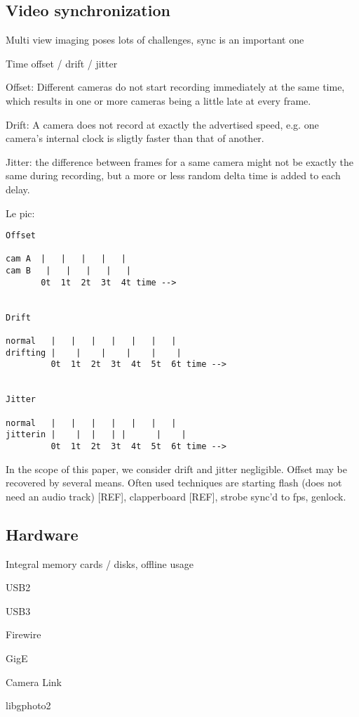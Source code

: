 \subsection{Video synchronization}

Multi view imaging poses lots of challenges, sync is an important one

Time offset / drift / jitter

Offset: Different cameras do not start recording immediately at the same time, which results in one or more cameras being a little late at every frame.

Drift: A camera does not record at exactly the advertised speed, e.g. one camera's internal clock is sligtly faster than that of another.

Jitter: the difference between frames for a same camera might not be exactly the same during recording, but a more or less random delta time is added to each delay.

Le pic:

\begin{verbatim}
Offset

cam A  |   |   |   |   |
cam B   |   |   |   |   |
       0t  1t  2t  3t  4t time -->


Drift

normal   |   |   |   |   |   |   |
drifting |    |    |    |    |    |
         0t  1t  2t  3t  4t  5t  6t time -->


Jitter

normal   |   |   |   |   |   |   |
jitterin |    |  |   | |      |    |
         0t  1t  2t  3t  4t  5t  6t time -->
\end{verbatim}

In the scope of this paper, we consider drift and jitter negligible.
Offset may be recovered by several means.
Often used techniques are starting flash (does not need an audio track) [REF], clapperboard [REF], strobe sync'd to fps, genlock.


\subsection{Hardware}

Integral memory cards / disks, offline usage

USB2

USB3

Firewire

GigE

Camera Link

libgphoto2


